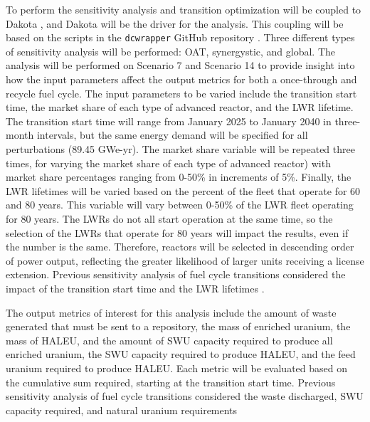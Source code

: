 To perform the sensitivity analysis and 
transition optimization \Cyclus will be coupled to Dakota \cite{adams_dakota_2019},
and Dakota will be the driver for the analysis. This coupling will be based on 
the scripts in the \texttt{dcwrapper} GitHub repository \cite{chee_arfc/dcwrapper_2019}.
Three different types 
of sensitivity analysis will be performed: \gls{OAT}, synergystic, 
and global. The analysis will be performed on Scenario 7 and Scenario 
14 to provide insight into how the input parameters affect the output 
metrics for both a once-through and recycle fuel cycle. 
The input parameters to be varied include the transition 
start time, the market share of each type of advanced reactor, and 
the \gls{LWR} lifetime. The transition start time will range from January 
2025 to January 2040 in three-month intervals, but the same energy demand 
will be specified for all perturbations (89.45 GWe-yr). The market share 
variable will be repeated three times, for varying the market share of each 
type of advanced reactor) with market share percentages ranging from 0-50\% 
in increments of 5\%. Finally, the \gls{LWR} lifetimes will be varied based 
on the percent of the fleet that operate for 60 and 80 years. This 
variable will vary between 0-50\% of the \gls{LWR} fleet operating for 80 
years. The \glspl{LWR} do not all start operation at the same time, so the 
selection of the \glspl{LWR} that operate for 80 years will impact the results, 
even if the number is the same. Therefore, reactors will be selected in 
descending order of power output, reflecting the greater likelihood of 
larger units receiving a license extension. Previous sensitivity analysis of 
fuel cycle transitions considered the impact of the transition start time 
and the \gls{LWR} lifetimes \cite{chee_sensitivity_2019,feng_sensitivity_2020}.

The output metrics of 
interest for this analysis include the amount of waste generated that 
must be sent to a repository, the mass of enriched uranium, the mass of 
\gls{HALEU}, and 
the amount of \gls{SWU} capacity required to produce all enriched uranium, the 
\gls{SWU} capacity required to produce \gls{HALEU}, and the feed uranium 
required to produce \gls{HALEU}. Each metric will be evaluated based on the 
cumulative sum required, starting at the transition start time. Previous 
sensitivity analysis of fuel cycle transitions considered the waste 
discharged, \gls{SWU} 
capacity required, and natural uranium requirements
\cite{richards_application_2021,feng_sensitivity_2020} 

